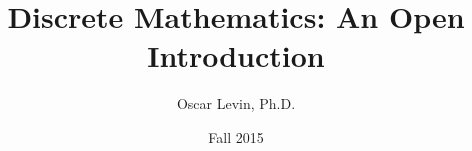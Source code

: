 \def\course{Math 228}

\title{Discrete Mathematics: An Open Introduction\\
}




\author{Oscar Levin, Ph.D.}

\date{Fall 2015} %

\maketitle

  

\tableofcontents


